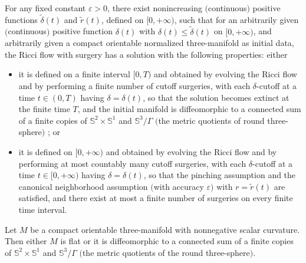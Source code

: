 \begin{theorem}
  \label{thm:cz-ricci-flow-surgery-long-time-existence}

For any fixed constant $\varepsilon >0$, there exist nonincreasing
$($continuous$)$ positive functions $\widetilde{\delta}(t)$ and
$\widetilde{r}(t)$, defined on $[0,+\infty)$, such that for an
arbitrarily given $($continuous$)$ positive function $\delta(t)$
with $\delta(t) \leq \widetilde{\delta}(t)$ on $[0,+\infty)$, and
arbitrarily given a compact orientable normalized three-manifold
as initial data, the Ricci flow with surgery has a solution with
the following properties: either
\begin{itemize}
\item[(i)] it is defined on a finite interval $[0,T)$ and obtained
by evolving the Ricci flow and by performing a finite number of
cutoff surgeries, with each $\delta$-cutoff at a time $t \in
(0,T)$ having ${\delta}= \delta(t)$, so that the solution becomes
extinct at the finite time $T$, and the initial manifold is
diffeomorphic to a connected sum of a finite copies of
$\mathbb{S}^2\times \mathbb{S}^1$ and $\mathbb{S}^3/\Gamma$ $($the
metric quotients of round three-sphere$)$ ; or \item[(ii)] it is
defined on $[0,+\infty)$ and obtained by evolving the Ricci flow
and by performing at most countably many cutoff surgeries, with
each $\delta$-cutoff at a time $t \in [0,+\infty)$ having
${\delta}=\delta(t)$, so that the pinching assumption and the
canonical neighborhood assumption $($with accuracy $\varepsilon)$
with $r=\widetilde{r}(t)$ are satisfied, and there exist at most a
finite number of surgeries on every finite time interval.
\end{itemize}
\end{theorem}
\begin{corollary}
  \label{cor:cz-finite-extinction-topological-classification}

 Let $M$ be a compact orientable three-manifold with nonnegative
scalar curvature. Then either $M$ is flat or it is diffeomorphic
to a connected sum of a finite copies of $\mathbb{S}^2\times
\mathbb{S}^1$ and $\mathbb{S}^3/\Gamma$ $($the metric quotients of
the round three-sphere$).$
\end{corollary}
